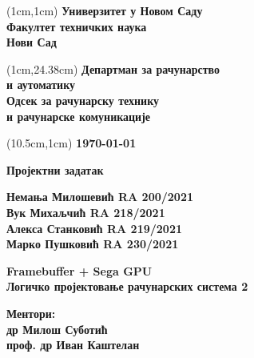 \documentclass{article}
\begin{document}
\begin{titlepage}
    \begin{textblock*}{10cm}(1cm,1cm)
        \textbf{\hspace{-0.779cm}  Универзитет у Новом Саду\\Факултет техничких наука\\Нови Сад}
    \end{textblock*}

    \begin{textblock*}{10cm}(1cm,24.38cm)
        \textbf{\hspace{-0.779cm} Департман за рачунарство\\и аутоматику\\Одсек за рачунарску технику\\и рачунарске комуникације}
    \end{textblock*}

    \begin{textblock*}{10cm}(10.5cm,1cm)
        \raggedleft
        \textbf{\today}
    \end{textblock*}
    
    \null{}
    
    \begin{center}
        \textbf{\LARGE Пројектни задатак}
        
        \vspace{1.5cm}
        
        \textbf{\large Немања Милошевић RA 200/2021}\\
        \vspace{0.15cm}
        \textbf{\large Вук Михаљчић RA 218/2021}\\
        \vspace{0.15cm}
        \textbf{\large Алекса Станковић RA 219/2021}\\
 	 \vspace{0.15cm}
        \textbf{\large Марко Пушковић RA 230/2021}
        
        \vspace{3.5cm}
        \textbf{\Huge Framebuffer + Sega GPU}\\
        \vspace{0.5cm}
        \textbf{\large Логичко пројектовање рачунарских система 2}
        
        \vfill
        
        \begin{flushright}
            \textbf{\large Ментори:}\\
            \textbf{др Милош Суботић}\\
            \textbf{проф. др Иван Каштелан}
        \end{flushright}
    \end{center}
\end{titlepage}
\end{document}
